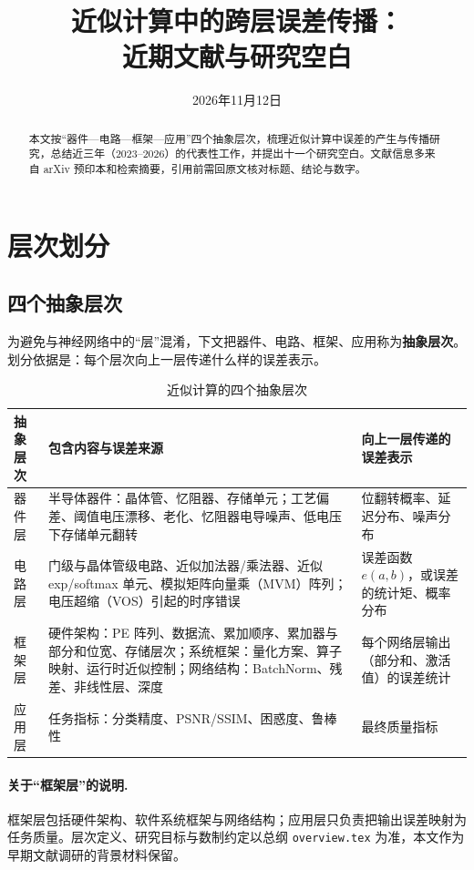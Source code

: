 \documentclass[11pt,a4paper]{ctexart}
\title{近似计算中的跨层误差传播：\\近期文献与研究空白}
\date{2026年11月12日}
\begin{document}
\maketitle

\begin{abstract}
本文按“器件—电路—框架—应用”四个抽象层次，梳理近似计算中误差的产生与传播研究，总结近三年（2023--2026）的代表性工作，并提出十一个研究空白。文献信息多来自 arXiv 预印本和检索摘要，引用前需回原文核对标题、结论与数字。
\end{abstract}

\section{层次划分}

\subsection{四个抽象层次}

为避免与神经网络中的“层”混淆，下文把器件、电路、框架、应用称为\textbf{抽象层次}。划分依据是：每个层次向上一层传递什么样的误差表示。

\begin{table}[h]
\centering
\small
\begin{tabularx}{\textwidth}{@{}lXX@{}}
\toprule
抽象层次 & 包含内容与误差来源 & 向上一层传递的误差表示 \\
\midrule
器件层 & 半导体器件：晶体管、忆阻器、存储单元；工艺偏差、阈值电压漂移、老化、忆阻器电导噪声、低电压下存储单元翻转 & 位翻转概率、延迟分布、噪声分布 \\
电路层 & 门级与晶体管级电路、近似加法器/乘法器、近似 exp/softmax 单元、模拟矩阵向量乘（MVM）阵列；电压超缩（VOS）引起的时序错误 & 误差函数 $e(a,b)$，或误差的统计矩、概率分布 \\
框架层 & 硬件架构：PE 阵列、数据流、累加顺序、累加器与部分和位宽、存储层次；系统框架：量化方案、算子映射、运行时近似控制；网络结构：BatchNorm、残差、非线性层、深度 & 每个网络层输出（部分和、激活值）的误差统计 \\
应用层 & 任务指标：分类精度、PSNR/SSIM、困惑度、鲁棒性 & 最终质量指标 \\
\bottomrule
\end{tabularx}
\caption{近似计算的四个抽象层次}
\label{tab:layers}
\end{table}

\paragraph{关于“框架层”的说明.}
框架层包括硬件架构、软件系统框架与网络结构；应用层只负责把输出误差映射为任务质量。层次定义、研究目标与数制约定以总纲 \texttt{overview.tex} 为准，本文作为早期文献调研的背景材料保留。
\end{document}
